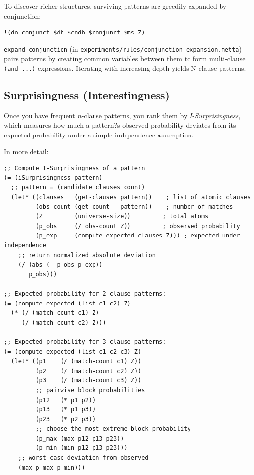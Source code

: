 \documentclass{article}
\begin{document}
To discover richer structures, surviving patterns are greedily expanded by conjunction:

\begin{verbatim}
!(do-conjunct $db $cndb $conjunct $ms Z)
\end{verbatim}

\texttt{expand_conjunction} (in \texttt{experiments/rules/conjunction-expansion.metta}) pairs patterns by creating common variables between them to form multi-clause \verb|(and ...)| expressions.  Iterating with increasing depth yields N-clause patterns.

\subsection{Surprisingness (Interestingness)}

Once you have frequent $n$-clause patterns, you rank them by \emph{I-Surprisingness}, which measures how much a pattern?s observed probability deviates from its expected probability under a simple independence assumption.  

In more detail:

\begin{verbatim}
;; Compute I-Surprisingness of a pattern
(= (iSurprisingness pattern)
  ;; pattern = (candidate clauses count)
  (let* ((clauses   (get-clauses pattern))    ; list of atomic clauses
         (obs-count (get-count   pattern))    ; number of matches
         (Z         (universe-size))         ; total atoms
         (p_obs     (/ obs-count Z))         ; observed probability
         (p_exp     (compute-expected clauses Z))) ; expected under independence
    ;; return normalized absolute deviation
    (/ (abs (- p_obs p_exp))
       p_obs)))

;; Expected probability for 2-clause patterns:
(= (compute-expected (list c1 c2) Z)
  (* (/ (match-count c1) Z)
     (/ (match-count c2) Z)))

;; Expected probability for 3-clause patterns:
(= (compute-expected (list c1 c2 c3) Z)
  (let* ((p1    (/ (match-count c1) Z))
         (p2    (/ (match-count c2) Z))
         (p3    (/ (match-count c3) Z))
         ;; pairwise block probabilities
         (p12   (* p1 p2))
         (p13   (* p1 p3))
         (p23   (* p2 p3))
         ;; choose the most extreme block probability
         (p_max (max p12 p13 p23))
         (p_min (min p12 p13 p23)))
    ;; worst-case deviation from observed
    (max p_max p_min)))
\end{verbatim}
\end{document}
